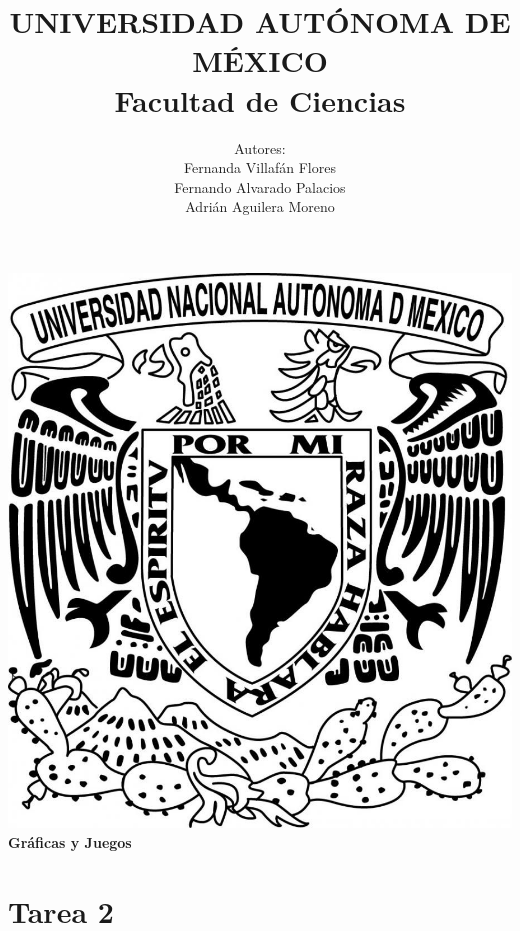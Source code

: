 \documentclass{article}
\begin{document}
\title{UNIVERSIDAD AUT\'ONOMA DE M\'EXICO\\ Facultad de Ciencias}
\author{Autores:
  \\ Fernanda Villaf\'an Flores
  \\ Fernando Alvarado Palacios
  \\ Adri\'an Aguilera Moreno}
\date{}
\maketitle
\begin{center}
  \includegraphics[scale=0.20]{../Imagen/Portada.jpg}\\[0.4cm]
  \Large
  \bf{Gr\'aficas y Juegos}
  \normalsize
\end{center}
\newpage
{}
\section*{\LARGE{Tarea 2}}
\end{document}
